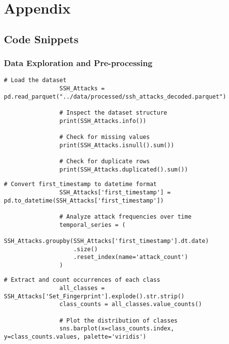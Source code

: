 
\appendix

\section{Appendix}

    \subsection{Code Snippets}

        \subsubsection{Data Exploration and Pre-processing}

            \begin{lstlisting}[caption={Load and inspect the dataset}, label={lst:load-inspect-dataset}]
                # Load the dataset
                SSH_Attacks = pd.read_parquet("../data/processed/ssh_attacks_decoded.parquet")
        
                # Inspect the dataset structure
                print(SSH_Attacks.info())
        
                # Check for missing values
                print(SSH_Attacks.isnull().sum())
        
                # Check for duplicate rows
                print(SSH_Attacks.duplicated().sum())
            \end{lstlisting}

            \begin{lstlisting}[caption={Convert timestamps and analyze frequencies}, label={lst:convert-analyze-frequencies}]
                # Convert first_timestamp to datetime format
                SSH_Attacks['first_timestamp'] = pd.to_datetime(SSH_Attacks['first_timestamp'])

                # Analyze attack frequencies over time
                temporal_series = (
                    SSH_Attacks.groupby(SSH_Attacks['first_timestamp'].dt.date)
                    .size()
                    .reset_index(name='attack_count')
                )
            \end{lstlisting}

            \begin{lstlisting}[caption={Extract and visualize class distribution}, label={lst:extract-visualize-classes}]
                # Extract and count occurrences of each class
                all_classes = SSH_Attacks['Set_Fingerprint'].explode().str.strip()
                class_counts = all_classes.value_counts()

                # Plot the distribution of classes
                sns.barplot(x=class_counts.index, y=class_counts.values, palette='viridis')
            \end{lstlisting}

